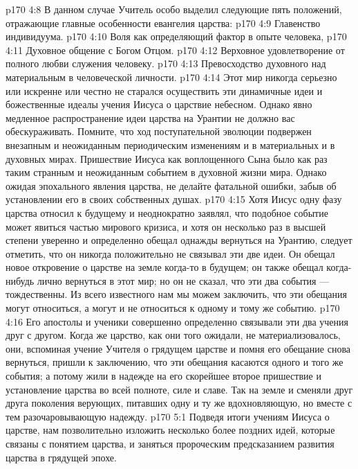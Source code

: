 \vs p170 4:8 В данном случае Учитель особо выделил следующие пять положений, отражающие главные особенности евангелия царства:
\vs p170 4:9 \bibnobreakspace Главенство индивидуума.
\vs p170 4:10 \bibnobreakspace Воля как определяющий фактор в опыте человека,
\vs p170 4:11 \bibnobreakspace Духовное общение с Богом Отцом.
\vs p170 4:12 \bibnobreakspace Верховное удовлетворение от полного любви служения человеку.
\vs p170 4:13 \bibnobreakspace Превосходство духовного над материальным в человеческой личности.
\vs p170 4:14 \pc Этот мир никогда серьезно или искренне или честно не старался осуществить эти динамичные идеи и божественные идеалы учения Иисуса о царствие небесном. Однако явно медленное распространение идеи царства на Урантии не должно вас обескураживать. Помните, что ход поступательной эволюции подвержен внезапным и неожиданным периодическим изменениям и в материальных и в духовных мирах. Пришествие Иисуса как воплощенного Сына было как раз таким странным и неожиданным событием в духовной жизни мира. Однако ожидая эпохального явления царства, не делайте фатальной ошибки, забыв об установлении его в своих собственных душах.
\vs p170 4:15 Хотя Иисус одну фазу царства относил к будущему и неоднократно заявлял, что подобное событие может явиться частью мирового кризиса, и хотя он несколько раз в высшей степени уверенно и определенно обещал однажды вернуться на Урантию, следует отметить, что он никогда положительно не связывал эти две идеи. Он обещал новое откровение о царстве на земле когда\hyp{}то в будущем; он также обещал когда\hyp{}нибудь лично вернуться в этот мир; но он не сказал, что эти два события --- тождественны. Из всего известного нам мы можем заключить, что эти обещания могут относиться, а могут и не относиться к одному и тому же событию.
\vs p170 4:16 Его апостолы и ученики совершенно определенно связывали эти два учения друг с другом. Когда же царство, как они того ожидали, не материализовалось, они, вспоминая учение Учителя о грядущем царстве и помня его обещание снова вернуться, пришли к заключению, что эти обещания касаются одного и того же события; а потому жили в надежде на его скорейшее второе пришествие и установление царства во всей полноте, силе и славе. Так на земле и сменяли друг друга поколения верующих, питавших одну и ту же вдохновляющую, но вместе с тем разочаровывающую надежду.
\vs p170 5:1 Подведя итоги учениям Иисуса о царстве, нам позволительно изложить несколько более поздних идей, которые связаны с понятием царства, и заняться пророческим предсказанием развития царства в грядущей эпохе.
